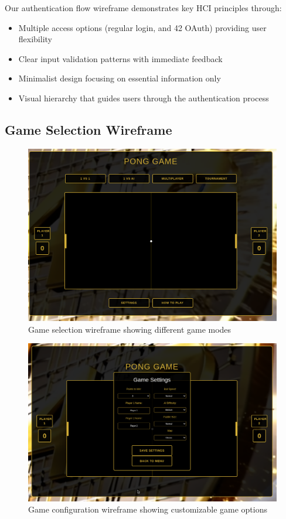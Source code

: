 Our authentication flow wireframe demonstrates key HCI principles through:
\begin{itemize}
    \item Multiple access options (regular login, and 42 OAuth) providing user flexibility
    \item Clear input validation patterns with immediate feedback
    \item Minimalist design focusing on essential information only
    \item Visual hierarchy that guides users through the authentication process
\end{itemize}

\subsection{Game Selection Wireframe}

\begin{figure}[H]
    \centering
    \includegraphics[width=0.7\linewidth]{Figures/images/new_images/GamePage.png}
    \caption{Game selection wireframe showing different game modes}
    \label{fig:wireframe-game-selection}
\end{figure}

\begin{figure}[H]
    \centering
    \includegraphics[width=0.7\linewidth]{Figures/images/new_images/GameSettings.png}
    \caption{Game configuration wireframe showing customizable game options}
    \label{fig:wireframe-game-config}
\end{figure}

